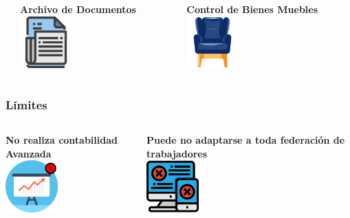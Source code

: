 \documentclass[xcolor=dvipsnames, xcolor=table]{beamer}
\begin{document}
\begin{frame}
\begin{columns}
\begin{column}{0.3\textwidth}
      \end{column}
      \begin{column}{0.3\textwidth}
        \centering\textbf{\textcolor{color3}{\small Archivo de Documentos}\vspace{3mm}}
        \vspace{10mm}
        \includegraphics[width=20mm]{003-file}
      \end{column}
      \begin{column}{0.3\textwidth}
        \centering\textbf{\textcolor{color3}{\small Control de Bienes Muebles}\vspace{3mm}}
        \vspace{10mm}
        \includegraphics[width=20mm]{004-armchair}
      \end{column}      
    \end{columns}
\end{frame}

\begin{frame}
    \frametitle{Límites}
    \begin{columns}
      \begin{column}{0.5\textwidth}
        \centering\textbf{\textcolor{color3}{No realiza contabilidad Avanzada}\vspace{3mm}}\\
        \vspace{5mm}
        \includegraphics[width=20mm]{contabilidad}
      \end{column}
      \begin{column}{0.5\textwidth}
        \centering\textbf{\textcolor{color3}{Puede no adaptarse a toda federación de trabajadores}\vspace{3mm}}\\
        \vspace{5mm}
        \includegraphics[width=20mm]{error}
      \end{column}
    \end{columns}
\end{frame}
\end{document}
